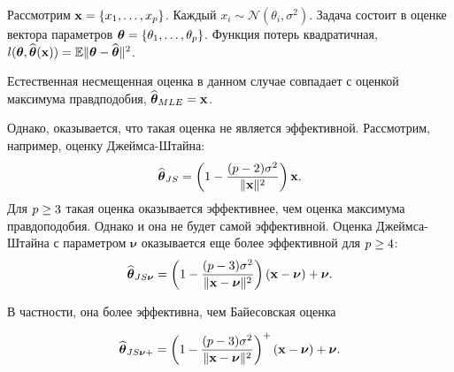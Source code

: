 \begin{example}
Рассмотрим $\mathbf{x} = \{x_1, \ldots, x_{p}\}$.
Каждый $x_i \sim \mathcal{N}(\theta_i, \sigma^2)$.
Задача состоит в оценке вектора параметров $\boldsymbol{\theta} = \{\theta_1, \ldots, \theta_{p}\}$.
Функция потерь квадратичная, $l(\boldsymbol{\theta}, \widehat{\boldsymbol{\theta}}(\mathbf{x})) = \mathbb{E} \|\boldsymbol{\theta} - \widehat{\boldsymbol{\theta}}\|^2$.

Естественная несмещенная оценка в данном случае совпадает с оценкой максимума правдподобия, $\widehat{\boldsymbol{\theta}}_{MLE} = \mathbf{x}$.

Однако, оказывается, что такая оценка не является эффективной.
Рассмотрим, например, оценку Джеймса-Штайна:
\[
\widehat{\boldsymbol{\theta}}_{JS} = \left(1 - \frac{(p - 2) \sigma^2}{\|\mathbf{x}\|^2} \right) \mathbf{x}.
\]
Для $p \geq 3$ такая оценка оказывается эффективнее, чем оценка максимума правдоподобия.
Однако и она не будет самой эффективной.
Оценка Джеймса-Штайна с параметром $\boldsymbol{\nu}$ оказывается еще более эффективной для $p \geq 4$:
\[
\widehat{\boldsymbol{\theta}}_{JS\boldsymbol{\nu}} = \left(1 - \frac{(p - 3) \sigma^2}{\|\mathbf{x} - \boldsymbol{\nu}\|^2} \right) (\mathbf{x} - \boldsymbol{\nu}) + \boldsymbol{\nu}.
\]

В частности, она более эффективна, чем Байесовская оценка 

\[
\widehat{\boldsymbol{\theta}}_{JS\boldsymbol{\nu}+} = \left(1 - \frac{(p - 3) \sigma^2}{\|\mathbf{x} - \boldsymbol{\nu}\|^2} \right)^+ (\mathbf{x} - \boldsymbol{\nu}) + \boldsymbol{\nu}.
\]
\end{example}


